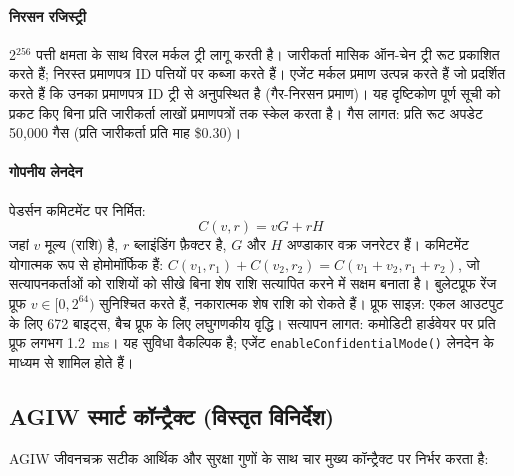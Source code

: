 \documentclass[11pt]{article}
\begin{document}
\paragraph{निरसन रजिस्ट्री} 2$^{256}$ पत्ती क्षमता के साथ विरल मर्कल ट्री लागू करती है। जारीकर्ता मासिक ऑन-चेन ट्री रूट प्रकाशित करते हैं; निरस्त प्रमाणपत्र ID पत्तियों पर कब्जा करते हैं। एजेंट मर्कल प्रमाण उत्पन्न करते हैं जो प्रदर्शित करते हैं कि उनका प्रमाणपत्र ID ट्री से अनुपस्थित है (गैर-निरसन प्रमाण)। यह दृष्टिकोण पूर्ण सूची को प्रकट किए बिना प्रति जारीकर्ता लाखों प्रमाणपत्रों तक स्केल करता है। गैस लागत: प्रति रूट अपडेट 50,000 गैस (प्रति जारीकर्ता प्रति माह \$0.30)।

\paragraph{गोपनीय लेनदेन} पेडर्सन कमिटमेंट पर निर्मित:
\begin{equation}
C(v, r) = vG + rH
\end{equation}
जहां $v$ मूल्य (राशि) है, $r$ ब्लाइंडिंग फ़ैक्टर है, $G$ और $H$ अण्डाकार वक्र जनरेटर हैं। कमिटमेंट योगात्मक रूप से होमोमॉर्फिक हैं: $C(v_1, r_1) + C(v_2, r_2) = C(v_1 + v_2, r_1 + r_2)$, जो सत्यापनकर्ताओं को राशियों को सीखे बिना शेष राशि सत्यापित करने में सक्षम बनाता है। बुलेटप्रूफ रेंज प्रूफ $v \in [0, 2^{64})$ सुनिश्चित करते हैं, नकारात्मक शेष राशि को रोकते हैं। प्रूफ साइज़: एकल आउटपुट के लिए 672 बाइट्स, बैच प्रूफ के लिए लघुगणकीय वृद्धि। सत्यापन लागत: कमोडिटी हार्डवेयर पर प्रति प्रूफ लगभग 1.2~ms। यह सुविधा वैकल्पिक है; एजेंट \texttt{enableConfidentialMode()} लेनदेन के माध्यम से शामिल होते हैं।

\subsection{AGIW स्मार्ट कॉन्ट्रैक्ट (विस्तृत विनिर्देश)}
\label{sec:agiw-contracts}
AGIW जीवनचक्र सटीक आर्थिक और सुरक्षा गुणों के साथ चार मुख्य कॉन्ट्रैक्ट पर निर्भर करता है:
\end{document}
